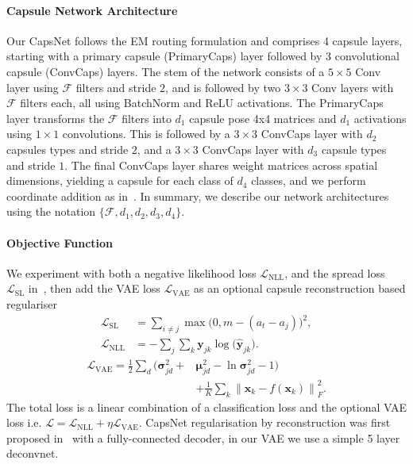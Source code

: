\documentclass[letterpaper]{article} \usepackage{aaai20}  \usepackage{times}  \usepackage{helvet} \usepackage{courier}  \usepackage[hyphens]{url}  \usepackage{graphicx} \urlstyle{rm} \def\UrlFont{\rm}  \usepackage{graphicx}  \frenchspacing  \setlength{\pdfpagewidth}{8.5in}  \setlength{\pdfpageheight}{11in}  \nocopyright
\newcommand{\norm}[1]{\left\lVert#1\right\rVert}
\begin{document}
\paragraph{Capsule Network Architecture}\label{sec: architecture}
Our CapsNet follows the EM routing formulation and comprises 4 capsule layers, starting with a primary capsule ({\selectfont PrimaryCaps}) layer followed by 3 convolutional capsule ({\selectfont ConvCaps}) layers. The stem of the network consists of a $5 \times 5$ {\selectfont Conv} layer using $\mathcal{F}$ filters and stride $2$, and is followed by two $3 \times 3$ {\selectfont Conv} layers with $\mathcal{F}$ filters each, all using {\selectfont BatchNorm} and {\selectfont ReLU} activations. The {\selectfont PrimaryCaps} layer transforms the $\mathcal{F}$ filters into $d_1$ capsule pose 4x4 matrices and $d_1$ activations using $1 \times 1$ convolutions. This is followed by a $3 \times 3$ {\selectfont ConvCaps} layer with $d_2$ capsules types and stride $2$, and a $3 \times 3$ {\selectfont ConvCaps} layer with $d_3$ capsule types and stride $1$. The final {\selectfont ConvCaps} layer shares weight matrices across spatial dimensions, yielding a capsule for each class of $d_4$ classes, and we perform coordinate addition as in~\cite{hinton2018matrix}. In summary, we describe our network architectures using the notation $\{\mathcal{F}, d_1, d_2, d_3, d_4\}$.
\paragraph{Objective Function}
We experiment with both a negative likelihood loss $\mathcal{L}_{\mathrm{NLL}}$, and the spread loss $\mathcal{L}_{\mathrm{SL}}$ in~\cite{hinton2018matrix}, then add the VAE loss $\mathcal{L}_{\mathrm{VAE}}$ as an optional capsule reconstruction based regulariser
\begin{equation}
\begin{aligned}
    \mathcal{L}_{\mathrm{SL}} &= \sum_{i \neq j} \max\big(0, m - (a_t - a_j)\big)^2, \\ 
    \mathcal{L}_{\mathrm{NLL}} &= -\sum_{j} \sum_{k} \mathbf{y}_{jk} \log\big(\widehat{\mathbf{y}}_{jk}\big).
\end{aligned}
\end{equation}
\begin{equation}
\begin{aligned}
    \mathcal{L}_{\mathrm{VAE}} = \frac{1}{2} \sum_{d} \big(\boldsymbol{\sigma}_{jd}^2 + &\boldsymbol{\mu}_{jd}^2 - \ln\boldsymbol{\sigma}_{jd}^2 - 1\big) \\ &+ \frac{1}{K}  \sum_{k}
    \norm{\mathbf{x}_{k} - f({\mathbf{x}_k})}^2_{F}.
\end{aligned}
\end{equation}
The total loss is a linear combination of a classification loss and the optional VAE loss i.e. $\mathcal{L} = \mathcal{L}_{\mathrm{NLL}} + \eta \mathcal{L}_{\mathrm{VAE}}$. CapsNet regularisation by reconstruction was first proposed in~\cite{sabour2017dynamic} with a fully-connected decoder, in our VAE we use a simple 5 layer deconvnet.
\end{document}

